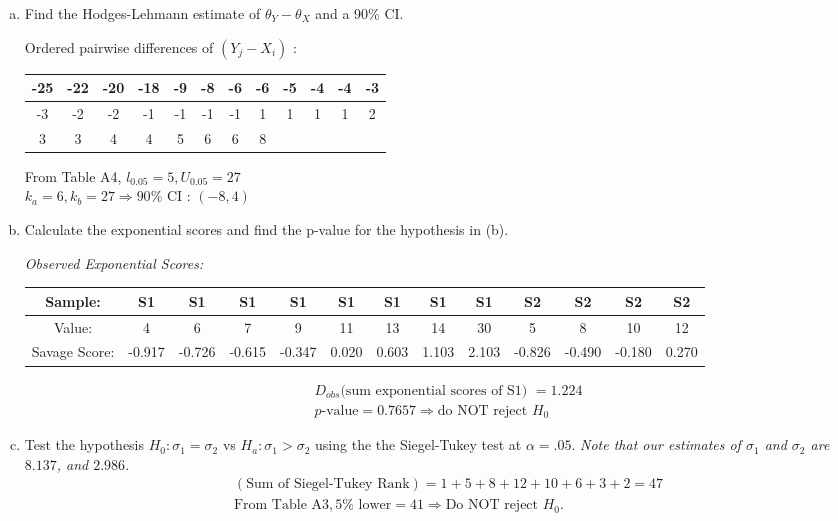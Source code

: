 \documentclass[12pt]{article}
\begin{document}
\begin{enumerate}[(a)]
\item Find the Hodges-Lehmann estimate of $\theta_Y-\theta_X$ and a 90\% CI.

Ordered pairwise differences of $(Y_j-X_i)$ : 
\begin{table}[H] \center
\begin{tabular}{|c|c|c|c|c|c|c|c|c|c|c|c|} \hline
-25 &-22& -20 &-18  &-9&  -8 & -6  &-6 & -5 & -4  &-4 & -3 \\ \hline
 -3 & -2 & -2& -1 & -1  &-1 & -1  & 1  & 1  & 1  & 1 &  2 \\ \hline
 3 & 3 &  4  & 4  & 5  & 6&6&8&&&&\\ \hline
\end{tabular}
\end{table}
From Table A4, $l_{0.05}=5, U_{0.05}=27$\\
$k_a=6, k_b=27 \Rightarrow 90\%$ CI : $(-8,4)$

\item Calculate the exponential scores and find the p-value for the hypothesis in (b).

\emph{Observed Exponential Scores: }
\begin{table}[H] \center \footnotesize
\begin{tabular}{|c|c|c|c|c|c|c|c|c|c|c|c|c|} \hline
Sample:			& S1 & S1 & S1 & S1 & S1 & S1 & S1 & S1 & S2 & S2 & S2 & S2 \\ \hline 
Value:			& 4 &  6 &  7 &  9 & 11 & 13 & 14 & 30 &  5 &  8 & 10 & 12 \\ \hline
Savage Score:	& -0.917 & -0.726 & -0.615 & -0.347 &  0.020 &  0.603 &  1.103 &  2.103 & -0.826 & -0.490 & -0.180 &  0.270 \\ \hline
\end{tabular}
\end{table}

\vspace{-3em}
\begin{align*}
& D_{obs} \text{(sum exponential scores of S1) } = 1.224 \\
& p\text{-value} = 0.7657 \Rightarrow \text{do NOT reject } H_0
\end{align*}

\item Test the hypothesis $H_0:\sigma_1=\sigma_2$ vs $H_a:\sigma_1>\sigma_2$ using the the Siegel-Tukey test at $\alpha=.05$.
\emph{Note that our estimates of $\sigma_1$ and $\sigma_2$ are $8.137$, and $2.986$.}
\begin{align*}
& (\text{Sum of Siegel-Tukey Rank}) = 1+5+8+12+10+6+3+2 = 47 \\
& \text{From Table A3}, 5\% \text{ lower} = 41 \Rightarrow \text{Do NOT reject } H_0. \\
\end{align*}


\end{enumerate}
\end{document}
